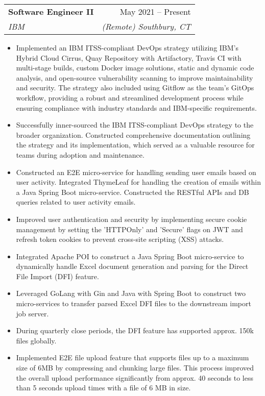 \documentclass[letterpaper,11pt]{article}
\makeatletter
\newcommand{\resumeItem}[1]{
  \item[-] \small{
    {#1 \vspace{-2pt}}
  }
}
\newcommand{\resumeSubheading}[4]{
  \vspace{-2pt}\item
    \begin{tabular*}{0.97\textwidth}[t]{l@{\extracolsep{\fill}}r}
      \textbf{#1} & #2 \\
      \textit{\small#3} & \textit{\small #4} \\
    \end{tabular*}\vspace{-7pt}
}
\newcommand{\resumeItemListStart}{\begin{itemize}[rightmargin=\dimexpr\linewidth-17.25cm-\leftmargin\relax]}
\newcommand{\resumeItemListEnd}{\end{itemize}\vspace{-5pt}}
\makeatother
\begin{document}
\resumeSubheading
{Software Engineer II}{May 2021 – Present}
{IBM}{(Remote) Southbury, CT}
\resumeItemListStart
\resumeItem{Implemented an IBM ITSS-compliant DevOps strategy utilizing IBM's Hybrid Cloud Cirrus, Quay Repository with Artifactory, Travis CI with multi-stage builds, custom Docker image solutions, static and dynamic code analysis, and open-source vulnerability scanning to improve maintainability and security. The strategy also included using Gitflow as the team's GitOps workflow, providing a robust and streamlined development process while ensuring compliance with industry standards and IBM-specific requirements.}
\resumeItem{Successfully inner-sourced the IBM ITSS-compliant DevOps strategy to the broader organization. Constructed comprehensive documentation outlining the strategy and its implementation, which served as a valuable resource for teams during adoption and maintenance.}
\resumeItem{Constructed an E2E micro-service for handling sending user emails based on user activity. Integrated ThymeLeaf for handling the creation of emails within a Java Spring Boot micro-service. Constructed the RESTful APIs and DB queries related to user activity emails.}
\resumeItem{Improved user authentication and security by implementing secure cookie management by setting the 'HTTPOnly' and 'Secure' flags on JWT and refresh token cookies to prevent cross-site scripting (XSS) attacks.}
\resumeItem{Integrated Apache POI to construct a Java Spring Boot micro-service to dynamically handle Excel document generation and parsing for the Direct File Import (DFI) feature.}
\resumeItem{Leveraged GoLang with Gin and Java with Spring Boot to construct two micro-services to transfer parsed Excel DFI files to the downstream import job server.}
\resumeItem{During quarterly close periods, the DFI feature has supported approx. 150k files globally.}
\resumeItem{Implemented E2E file upload feature that supports files up to a maximum size of 6MB by compressing and chunking large files. This process improved the overall upload performance significantly from approx. 40 seconds to less than 5 seconds upload times with a file of 6 MB in size.}
\resumeItemListEnd
\end{document}
